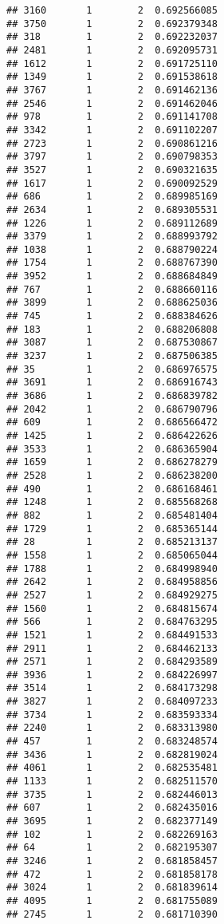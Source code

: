 \documentclass[
]{article}
\begin{document}
\begin{verbatim}
## 3160       1        2  0.692566085
## 3750       1        2  0.692379348
## 318        1        2  0.692232037
## 2481       1        2  0.692095731
## 1612       1        2  0.691725110
## 1349       1        2  0.691538618
## 3767       1        2  0.691462136
## 2546       1        2  0.691462046
## 978        1        2  0.691141708
## 3342       1        2  0.691102207
## 2723       1        2  0.690861216
## 3797       1        2  0.690798353
## 3527       1        2  0.690321635
## 1617       1        2  0.690092529
## 686        1        2  0.689985169
## 2634       1        2  0.689305531
## 1226       1        2  0.689112689
## 3379       1        2  0.688993792
## 1038       1        2  0.688790224
## 1754       1        2  0.688767390
## 3952       1        2  0.688684849
## 767        1        2  0.688660116
## 3899       1        2  0.688625036
## 745        1        2  0.688384626
## 183        1        2  0.688206808
## 3087       1        2  0.687530867
## 3237       1        2  0.687506385
## 35         1        2  0.686976575
## 3691       1        2  0.686916743
## 3686       1        2  0.686839782
## 2042       1        2  0.686790796
## 609        1        2  0.686566472
## 1425       1        2  0.686422626
## 3533       1        2  0.686365904
## 1659       1        2  0.686278279
## 2528       1        2  0.686238200
## 490        1        2  0.686168461
## 1248       1        2  0.685568268
## 882        1        2  0.685481404
## 1729       1        2  0.685365144
## 28         1        2  0.685213137
## 1558       1        2  0.685065044
## 1788       1        2  0.684998940
## 2642       1        2  0.684958856
## 2527       1        2  0.684929275
## 1560       1        2  0.684815674
## 566        1        2  0.684763295
## 1521       1        2  0.684491533
## 2911       1        2  0.684462133
## 2571       1        2  0.684293589
## 3936       1        2  0.684226997
## 3514       1        2  0.684173298
## 3827       1        2  0.684097233
## 3734       1        2  0.683593334
## 2240       1        2  0.683313980
## 457        1        2  0.683248574
## 3436       1        2  0.682819024
## 4061       1        2  0.682535481
## 1133       1        2  0.682511570
## 3735       1        2  0.682446013
## 607        1        2  0.682435016
## 3695       1        2  0.682377149
## 102        1        2  0.682269163
## 64         1        2  0.682195307
## 3246       1        2  0.681858457
## 472        1        2  0.681858178
## 3024       1        2  0.681839614
## 4095       1        2  0.681755089
## 2745       1        2  0.681710390

\end{verbatim}
\end{document}
